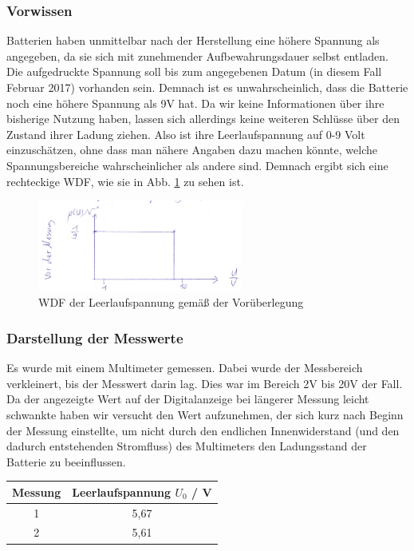 \documentclass[
	a4paper,
	12pt,
	pagesize,
	ngerman
]{scrartcl}
\begin{document}
	\subsubsection{Vorwissen}
	Batterien haben unmittelbar nach der Herstellung eine höhere Spannung als angegeben, da sie sich mit zunehmender Aufbewahrungsdauer selbst entladen. Die aufgedruckte Spannung soll bis zum angegebenen Datum (in diesem Fall Februar 2017) vorhanden sein. Demnach ist es unwahrscheinlich, dass die Batterie noch eine höhere Spannung als 9V hat. Da wir keine Informationen über ihre bisherige Nutzung haben, lassen sich allerdings keine weiteren Schlüsse über den Zustand ihrer Ladung ziehen. Also ist ihre Leerlaufspannung auf 0-9 Volt einzuschätzen, ohne dass man nähere Angaben dazu machen könnte, welche Spannungsbereiche wahrscheinlicher als andere sind. Demnach ergibt sich eine rechteckige WDF, wie sie in Abb. \ref{WDF} zu sehen ist.
	\begin{figure}[htb]
		\centering
		\includegraphics[width=0.6\textwidth]{WDF} %
		\caption{WDF der Leerlaufspannung gemäß der Vorüberlegung}
		\label{WDF}
	\end{figure}
	\subsubsection{Darstellung der Messwerte}
	Es wurde mit einem Multimeter gemessen. Dabei wurde der Messbereich verkleinert, bis der Messwert darin lag. Dies war im Bereich 2V bis 20V der Fall.  Da der angezeigte Wert auf der Digitalanzeige bei längerer Messung leicht schwankte haben wir versucht den Wert aufzunehmen, der sich kurz nach Beginn der Messung einstellte, um nicht durch den endlichen Innenwiderstand (und den dadurch entstehenden Stromfluss) des Multimeters den Ladungsstand der Batterie zu beeinflussen. %

	\begin{tabular}{| c | c |}
		\hline
		Messung & Leerlaufspannung $U_0$ / \si{V}\\ \hline
		1 & 5,67\\
		2 & 5,61\\ \hline
	\end{tabular}
\end{document}

